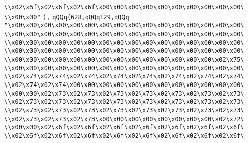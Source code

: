 \verb|\\x02\x6f\x02\x6f\x02\x6f\x00\x00\x00\x00\x00\x00\x00\x00\x00\x00\|\newline
\verb|\\x00\x00"|\newline
\verb|),|\newline
\verb|qQQq(628,qQQq129,qQQq|\newline
\verb|"\x00\x00\x00\x00\x00\x00\x00\x00\x00\x00\x00\x00\x00\x00\x00\x00\|\newline
\verb|\\x00\x00\x00\x00\x00\x00\x00\x00\x00\x00\x00\x00\x00\x00\x00\x00\|\newline
\verb|\\x00\x00\x00\x00\x00\x00\x00\x00\x00\x00\x00\x00\x00\x00\x00\x00\|\newline
\verb|\\x00\x00\x00\x00\x00\x00\x00\x00\x00\x00\x00\x00\x00\x00\x00\x00\|\newline
\verb|\\x00\x00\x00\x00\x00\x00\x00\x00\x00\x00\x00\x00\x00\x00\x02\x75\|\newline
\verb|\\x00\x00\x00\x00\x00\x00\x00\x00\x00\x00\x00\x00\x00\x00\x00\x00\|\newline
\verb|\\x02\x74\x02\x74\x02\x74\x02\x74\x02\x74\x02\x74\x02\x74\x02\x74\|\newline
\verb|\\x02\x74\x02\x74\x00\x00\x00\x00\x00\x00\x00\x00\x00\x00\x00\x00\|\newline
\verb|\\x00\x00\x02\x73\x02\x73\x02\x73\x02\x73\x02\x73\x02\x73\x02\x73\|\newline
\verb|\\x02\x73\x02\x73\x02\x73\x02\x73\x02\x73\x02\x73\x02\x73\x02\x73\|\newline
\verb|\\x02\x73\x02\x73\x02\x73\x02\x73\x02\x73\x02\x73\x02\x73\x02\x73\|\newline
\verb|\\x02\x73\x02\x73\x02\x73\x00\x00\x00\x00\x00\x00\x00\x00\x02\x72\|\newline
\verb|\\x00\x00\x02\x6f\x02\x6f\x02\x6f\x02\x6f\x02\x6f\x02\x6f\x02\x6f\|\newline
\verb|\\x02\x6f\x02\x6f\x02\x6f\x02\x6f\x02\x6f\x02\x6f\x02\x6f\x02\x6f\|\newline
